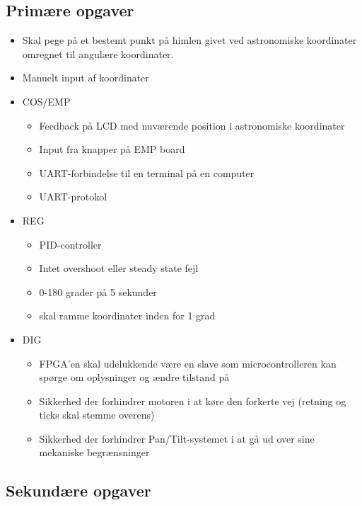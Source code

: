 \subsection{Primære opgaver}
\begin{itemize}
	\item Skal pege på et bestemt punkt på himlen givet ved astronomiske koordinater omregnet til angulære koordinater.
	\item Manuelt input af koordinater
	\item COS/EMP
	\begin{itemize}[noitemsep]
		\item Feedback på LCD med nuværende position i astronomiske koordinater
		\item Input fra knapper på EMP board
		\item UART-forbindelse til en terminal på en computer
		\item UART-protokol
	\end{itemize}
	\item REG
	\begin{itemize}[noitemsep]
		\item PID-controller
		\item Intet overshoot eller steady state fejl
		\item 0-180 grader på 5 sekunder
		\item skal ramme koordinater inden for 1 grad
	\end{itemize}
	\item DIG
	\begin{itemize}[noitemsep]
		\item FPGA'en skal udelukkende være en slave som microcontrolleren kan spørge om oplysninger og ændre tilstand på
		\item Sikkerhed der forhindrer motoren i at køre den forkerte vej (retning og ticks skal stemme overens)
		\item Sikkerhed der forhindrer Pan/Tilt-systemet i at gå ud over sine mekaniske begrænsninger
	\end{itemize}		
\end{itemize}

\subsection{Sekundære opgaver}

